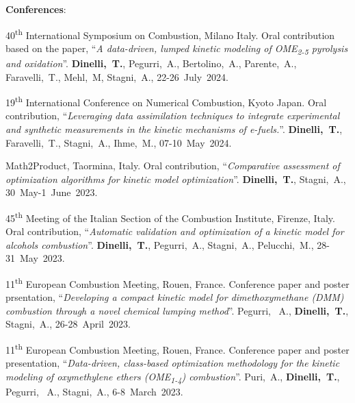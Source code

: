 \textbf{Conferences}:
\begin{etaremune}
   \item
      40\textsuperscript{th} International Symposium on Combustion, Milano Italy. Oral
      contribution based on the paper, ``{\it A data-driven, lumped kinetic modeling of
      OME\textsubscript{2-5} pyrolysis and oxidation}''. {\bf Dinelli,~T.},
      Pegurri,~A., Bertolino,~A., Parente,~A., Faravelli,~T., Mehl,~M, Stagni,~A.,
      22-26~July~2024.

   \item
      19\textsuperscript{th} International Conference on Numerical Combustion, Kyoto
      Japan. Oral contribution, ``{\it Leveraging data assimilation techniques to
      integrate experimental and synthetic measurements in the kinetic mechanisms of
      e-fuels.}''. {\bf Dinelli,~T.}, Faravelli,~T., Stagni,~A., Ihme,~M.,
      07-10~May~2024.

   \item
      Math2Product, Taormina, Italy. Oral contribution, ``{\it Comparative
      assessment of optimization algorithms for kinetic model optimization}''.
      {\bf Dinelli,~T.}, Stagni,~A.,
      30~May-1~June~2023.

   \item
      45\textsuperscript{th} Meeting of the Italian Section of the Combustion Institute,
      Firenze, Italy. Oral contribution, ``{\it Automatic validation and optimization
      of a kinetic model for alcohols combustion}''. {\bf Dinelli,~T.},
      Pegurri,~A., Stagni,~A., Pelucchi,~M.,
      28-31~May~2023.

   \item
      11\textsuperscript{th} European Combustion Meeting, Rouen, France. Conference paper
      and poster prsentation, ``{\it Developing a compact kinetic model for
      dimethoxymethane (DMM) combustion through a novel chemical lumping method}''.
      Pegurri, ~A., {\bf Dinelli,~T.}, Stagni,~A.,
      26-28~April~2023.

   \item
      11\textsuperscript{th} European Combustion Meeting, Rouen, France. Conference paper
      and poster presentation, ``{\it Data-driven, class-based optimization methodology
      for the kinetic modeling of oxymethylene ethers (OME\textsubscript{1-4}) combustion}''.
      Puri,~A., {\bf Dinelli,~T.}, Pegurri, ~A., Stagni,~A.,
      6-8~March~2023.


\end{etaremune}
